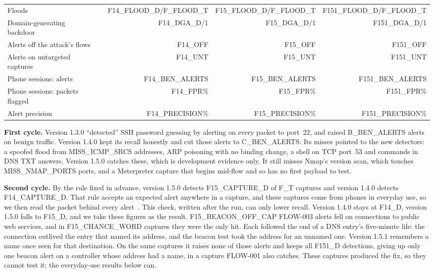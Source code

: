 \documentclass[runningheads]{llncs}
\begin{document}
\begin{table}[t]
\begin{tabular}{@{}lrrrr@{}}
\quad Floods & & {{F14_FLOOD_D}}/{{F_FLOOD_T}} & {{F15_FLOOD_D}}/{{F_FLOOD_T}} & {{F151_FLOOD_D}}/{{F_FLOOD_T}} \\
\quad Domain-generating backdoor & & {{F14_DGA_D}}/1 & {{F15_DGA_D}}/1 & {{F151_DGA_D}}/1 \\
Alerts off the attack's flows & & {{F14_OFF}} & {{F15_OFF}} & {{F151_OFF}} \\
Alerts on untargeted captures & & {{F14_UNT}} & {{F15_UNT}} & {{F151_UNT}} \\
Phone sessions: alerts & & {{F14_BEN_ALERTS}} & {{F15_BEN_ALERTS}} & {{F151_BEN_ALERTS}} \\
Phone sessions: packets flagged & & {{F14_FPR}}\% & {{F15_FPR}}\% & {{F151_FPR}}\% \\
Alert precision & & {{F14_PRECISION}}\% & {{F15_PRECISION}}\% & {{F151_PRECISION}}\% \\
\bottomrule
\end{tabular}
\end{table}

\textbf{First cycle.} Version 1.3.0 ``detected'' SSH password guessing by alerting on every packet to port~22, and raised {{B_BEN_ALERTS}} alerts on benign traffic. Version 1.4.0 kept its recall honestly and cut those alerts to {{C_BEN_ALERTS}}. Its misses pointed to the new detectors: a spoofed flood from {{MISS_ICMP_SRCS}} addresses, ARP poisoning with no binding change, a shell on TCP port~53 and commands in DNS TXT answers. Version 1.5.0 catches these, which is development evidence only. It still misses Nmap's version scan, which touches {{MISS_NMAP_PORTS}} ports, and a Meterpreter capture that begins mid-flow and so has no first payload to test.

\textbf{Second cycle.} By the rule fixed in advance, version 1.5.0 detects {{F15_CAPTURE_D}} of {{F_T}} captures and version 1.4.0 detects {{F14_CAPTURE_D}}. That rule accepts an expected alert anywhere in a capture, and these captures come from phones in everyday use, so we then read the packet behind every alert~\cite{repo}. This check, written after the run, can only lower recall. Version 1.4.0 stays at {{F14_D}}, version 1.5.0 falls to {{F15_D}}, and we take these figures as the result. {{F15_BEACON_OFF_CAP}} FLOW-003 alerts fell on connections to public web services, and in {{F15_CHANCE_WORD}} captures they were the only hit. Each followed the end of a DNS entry's five-minute life: the connection outlived the entry that named its address, and the beacon test took the address for an unnamed one. Version 1.5.1 remembers a name once seen for that destination. On the same captures it raises none of those alerts and keeps all {{F151_D}} detections, giving up only one beacon alert on a controller whose address had a name, in a capture FLOW-001 also catches. These captures produced the fix, so they cannot test it; the everyday-use results below can.
\end{document}
